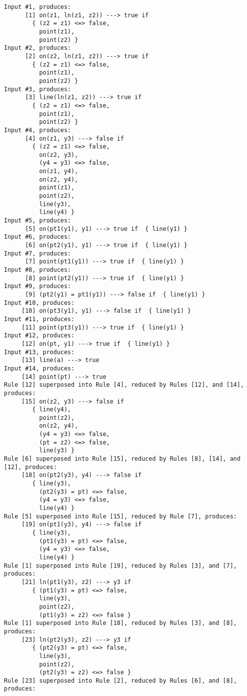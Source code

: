 \begin{verbatim}
Input #1, produces:
      [1] on(z1, ln(z1, z2)) ---> true if 
        { (z2 = z1) <=> false,
          point(z1),
          point(z2) } 
Input #2, produces:
      [2] on(z2, ln(z1, z2)) ---> true if 
        { (z2 = z1) <=> false,
          point(z1),
          point(z2) } 
Input #3, produces:
      [3] line(ln(z1, z2)) ---> true if 
        { (z2 = z1) <=> false,
          point(z1),
          point(z2) } 
Input #4, produces:
      [4] on(z1, y3) ---> false if 
        { (z2 = z1) <=> false,
          on(z2, y3),
          (y4 = y3) <=> false,
          on(z1, y4),
          on(z2, y4),
          point(z1),
          point(z2),
          line(y3),
          line(y4) } 
Input #5, produces:
      [5] on(pt1(y1), y1) ---> true if  { line(y1) } 
Input #6, produces:
      [6] on(pt2(y1), y1) ---> true if  { line(y1) } 
Input #7, produces:
      [7] point(pt1(y1)) ---> true if  { line(y1) } 
Input #8, produces:
      [8] point(pt2(y1)) ---> true if  { line(y1) } 
Input #9, produces:
      [9] (pt2(y1) = pt1(y1)) ---> false if  { line(y1) } 
Input #10, produces:
     [10] on(pt3(y1), y1) ---> false if  { line(y1) } 
Input #11, produces:
     [11] point(pt3(y1)) ---> true if  { line(y1) } 
Input #12, produces:
     [12] on(pt, y1) ---> true if  { line(y1) } 
Input #13, produces:
     [13] line(a) ---> true
Input #14, produces:
     [14] point(pt) ---> true
Rule [12] superposed into Rule [4], reduced by Rules [12], and [14], produces:
     [15] on(z2, y3) ---> false if 
        { line(y4),
          point(z2),
          on(z2, y4),
          (y4 = y3) <=> false,
          (pt = z2) <=> false,
          line(y3) } 
Rule [6] superposed into Rule [15], reduced by Rules [8], [14], and [12], produces:
     [18] on(pt2(y3), y4) ---> false if 
        { line(y3),
          (pt2(y3) = pt) <=> false,
          (y4 = y3) <=> false,
          line(y4) } 
Rule [5] superposed into Rule [15], reduced by Rule [7], produces:
     [19] on(pt1(y3), y4) ---> false if 
        { line(y3),
          (pt1(y3) = pt) <=> false,
          (y4 = y3) <=> false,
          line(y4) } 
Rule [1] superposed into Rule [19], reduced by Rules [3], and [7], produces:
     [21] ln(pt1(y3), z2) ---> y3 if 
        { (pt1(y3) = pt) <=> false,
          line(y3),
          point(z2),
          (pt1(y3) = z2) <=> false } 
Rule [1] superposed into Rule [18], reduced by Rules [3], and [8], produces:
     [23] ln(pt2(y3), z2) ---> y3 if 
        { (pt2(y3) = pt) <=> false,
          line(y3),
          point(z2),
          (pt2(y3) = z2) <=> false } 
Rule [23] superposed into Rule [2], reduced by Rules [6], and [8], produces:

\end{verbatim}
